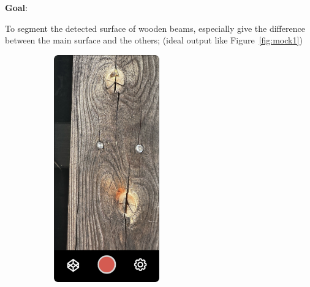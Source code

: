 \renewcommand\thesection{\arabic{section}}
\renewcommand\thesubsection{\thesection.\arabic{subsection}}


\textbf{Goal}:

To segment the detected surface of wooden beams, especially give the difference between the main surface and the others; (ideal output like Figure~\ref{fig:mock1})

\hspace*{\fill}


\begin{figure}[ht]
  \centering
    \begin{subfigure}[b]{0.4\textwidth}
      \centering
        \includegraphics[width=0.5\textwidth]{Master Thesis/Images/Section_3/Mock/3-Mock1.png}
    \end{subfigure}
    \begin{subfigure}[b]{0.4\textwidth}
      \centering

\end{subfigure}
\end{figure}
